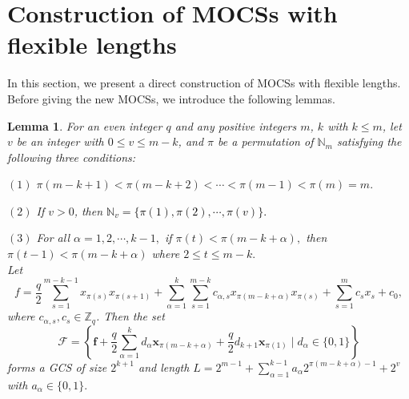 \documentclass[11pt]{article}
\newcommand{\2} {$2$-to-$1$}
\newtheorem{lem}[thm]{\bfseries   Lemma}
\begin{document}
\section{Construction of MOCSs with flexible lengths}
In this section, we present a direct construction of MOCSs with flexible lengths. Before giving the new MOCSs, we introduce the following lemmas.
\begin{lem}\cite{CC3}\label{2}
	For an even integer $q$ and any positive integers $m$,  $ k$ with $k\leq m$, let $v$ be an integer with $0\leq v\leq m-k$, and $\pi$ be a permutation of $\mathbb{N}_m$ satisfying the following three conditions:
	
	$ (1) $ $\pi(m-k+1)<\pi(m-k+2)<\cdots<\pi(m-1)<\pi(m)=m.$
	
	$ (2) $ If $v>0$, then \textcolor{black}{$\mathbb{N}_v=\{\pi(1),\pi(2),\cdots,\pi(v)\}.$}
	
	$ 	(3) $ For all $\alpha=1,2,\cdots,k-1,$ if $\pi(t)<\pi(m-k+\alpha),$ then $\pi(t-1)<\pi(m-k+\alpha)$ where $2\leq t\leq m-k.$\\
Let
	$$f=\frac{q}{2}\sum^{m-k-1}_{s=1}x_{\pi(s)}x_{\pi(s+1)}+\sum^{k}_{\alpha=1}\sum^{m-k}_{s=1}c_{\alpha,s}x_{\pi(m-k+\alpha)}x_{\pi(s)}
	+\sum^{m}_{s=1}c_{s}x_{s}+c_{0},$$
	where $c_{\alpha,s}, c_{s}\in \mathbb{Z}_{q}$. Then the set
	$$\mathcal{F}=\left\{\mathbf{f}+\frac{q}{2}\sum^{k}_{\alpha=1}d_{\alpha}\mathbf{x}_{\pi(m-k+\alpha)}+\frac{q}{2}d_{k+1}\mathbf{x}_{\pi(1)}\mid d_{\alpha}\in \{0,1\}\right\}$$ forms a GCS of size $2^{k+1}$ and length $L=2^{m-1}+\sum^{k-1}_{\alpha=1}a_{\alpha}2^{\pi(m-k+\alpha)-1}+2^v$ with $a_{\alpha}\in \{0,1\}.$
\end{lem}
\end{document}
